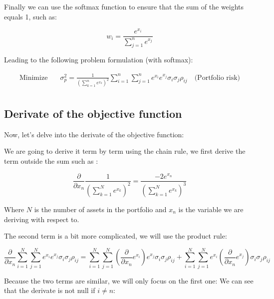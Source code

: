 \documentclass[12pt]{article}
\begin{document}
Finally we can use the softmax function to ensure that the sum of the weights equals 1, such as:

\begin{equation}
    w_i = \frac{e^{x_i}}{\sum_{j=1}^{n} e^{x_j}}
\end{equation}

Leading to the following problem formulation (with softmax):

\begin{equation}
    \begin{aligned}
        \text{Minimize} \quad   & \sigma_p^2 = \frac{1}{(\sum_{k=1}^{n} e^{x_k})^{2}} \sum_{i=1}^{n}\sum_{j=1}^{n} e^{x_i} e^{x_j}\sigma_i \sigma_j \rho_{ij} \quad \text{(Portfolio risk)} \\
    \end{aligned}
\end{equation}

\subsection*{Derivate of the objective function}

Now, let's delve into the derivate of the objective function:

We are going to derive it term by term using the chain rule, we first derive the term outside the sum such as :

\begin{equation}
    \frac{\partial}{\partial x_n} \frac{1}{(\sum_{k=1}^{N} e^{x_k})^{2}} = \frac{-2 e^{x_n}}{(\sum_{k=1}^{N} e^{x_k})^{3}}
\end{equation}

Where $N$ is the number of assets in the portfolio and $x_n$ is the variable we are deriving with respect to.

The second term is a bit more complicated, we will use the product rule:

\begin{equation}
    \frac{\partial}{\partial x_n} \sum_{i=1}^{N}\sum_{j=1}^{N} e^{x_i} e^{x_j}\sigma_i \sigma_j \rho_{ij} = \sum_{i=1}^{N}\sum_{j=1}^{N}( \frac{\partial}{\partial x_n} e^{x_i} ) e^{x_j}\sigma_i \sigma_j \rho_{ij} + \sum_{i=1}^{N}\sum_{j=1}^{N} e^{x_i}( \frac{\partial}{\partial x_n} e^{x_j} )\sigma_i \sigma_j \rho_{ij} 
\end{equation}

Because the two terms are similar, we will only focus on the first one:
We can see that the derivate is not null if $i \neq n$:
\end{document}
